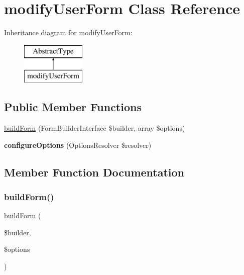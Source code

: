 \hypertarget{class_app_1_1_forms_1_1modify_user_form}{}\section{modify\+User\+Form Class Reference}
\label{class_app_1_1_forms_1_1modify_user_form}
Inheritance diagram for modify\+User\+Form\+:\begin{figure}[H]
\begin{center}
\leavevmode
\includegraphics[height=2.000000cm]{class_app_1_1_forms_1_1modify_user_form}
\end{center}
\end{figure}
\subsection*{Public Member Functions}
\begin{DoxyCompactItemize}
\item 
\mbox{\hyperlink{class_app_1_1_forms_1_1modify_user_form_a83c3745710374f9c5a1eb0686fe2dfab}{build\+Form}} (Form\+Builder\+Interface \$builder, array \$options)
\item 
\mbox{\label{class_app_1_1_forms_1_1modify_user_form_a8ff68a86f5090b5df973286836e46ead}} 
{\bfseries configure\+Options} (Options\+Resolver \$resolver)
\end{DoxyCompactItemize}


\subsection{Member Function Documentation}
\mbox{\label{class_app_1_1_forms_1_1modify_user_form_a83c3745710374f9c5a1eb0686fe2dfab}} 
\subsubsection{\texorpdfstring{buildForm()}{buildForm()}}
{\footnotesize\ttfamily build\+Form (\begin{DoxyParamCaption}\item[{Form\+Builder\+Interface}]{\$builder,  }\item[{array}]{\$options }\end{DoxyParamCaption})}


